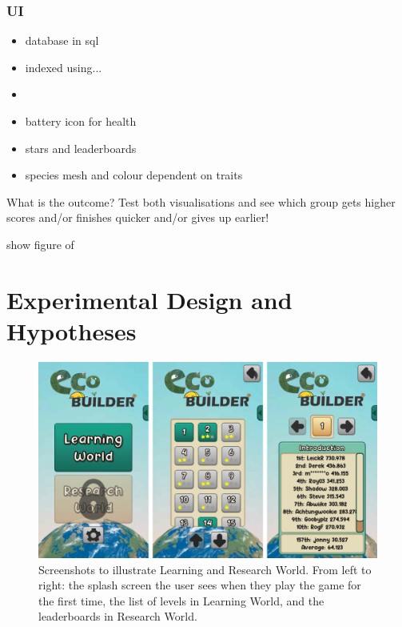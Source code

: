 \subsubsection{UI}
\begin{itemize}
  \item database in sql
  \item indexed using...
  \item 
  \item battery icon for health
  \item stars and leaderboards
  \item species mesh and colour dependent on traits
\end{itemize}

What is the outcome? Test both visualisations and see which group gets higher scores and/or finishes quicker and/or gives up earlier!

show figure of 

\section{Experimental Design and Hypotheses}
\begin{figure}
    \centering
    \includegraphics[width=\textwidth]{joy/worlds.png}
    \caption[Learning World and Research World]{Screenshots to illustrate Learning and Research World. From left to right: the splash screen the user sees when they play the game for the first time, the list of levels in Learning World, and the leaderboards in Research World.}
    \label{fig:eco_worlds}
\end{figure}

